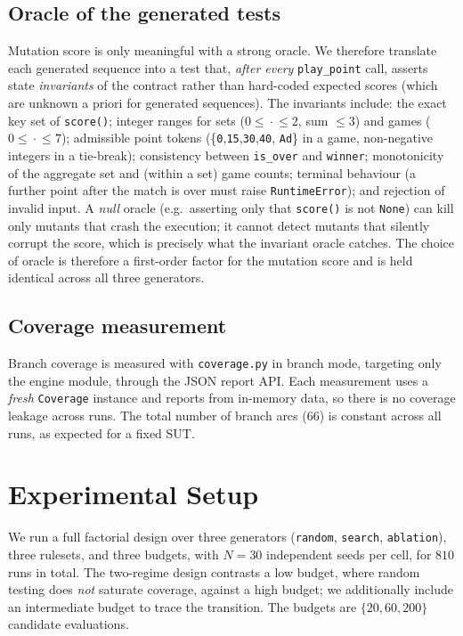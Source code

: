 \documentclass[conference]{IEEEtran}
\begin{document}
\subsection{Oracle of the generated tests}
Mutation score is only meaningful with a strong oracle. We therefore translate
each generated sequence into a test that, \emph{after every} \texttt{play\_point}
call, asserts state \emph{invariants} of the contract rather than hard-coded
expected scores (which are unknown a priori for generated sequences). The
invariants include: the exact key set of \texttt{score()}; integer ranges for
sets ($0\!\le\!\cdot\!\le\!2$, sum $\le 3$) and games ($0\!\le\!\cdot\!\le\!7$);
admissible point tokens (\{\texttt{0},\texttt{15},\texttt{30},\texttt{40},
\texttt{Ad}\} in a game, non-negative integers in a tie-break); consistency
between \texttt{is\_over} and \texttt{winner}; monotonicity of the aggregate set
and (within a set) game counts; terminal behaviour (a further point after the
match is over must raise \texttt{RuntimeError}); and rejection of invalid input.
A \emph{null} oracle (e.g.\ asserting only that \texttt{score()} is not
\texttt{None}) can kill only mutants that crash the execution; it cannot detect
mutants that silently corrupt the score, which is precisely what the invariant
oracle catches. The choice of oracle is therefore a first-order factor for the
mutation score and is held identical across all three generators.

\subsection{Coverage measurement}
Branch coverage is measured with \texttt{coverage.py} in branch mode, targeting
only the engine module, through the JSON report API. Each measurement uses a
\emph{fresh} \texttt{Coverage} instance and reports from in-memory data, so there
is no coverage leakage across runs. The total number of branch arcs (66) is
constant across all runs, as expected for a fixed SUT.

\section{Experimental Setup}
We run a full factorial design over three generators (\texttt{random},
\texttt{search}, \texttt{ablation}), three rulesets, and three budgets, with
$N{=}30$ independent seeds per cell, for $810$ runs in total. The two-regime
design contrasts a low budget, where random testing does \emph{not} saturate
coverage, against a high budget; we additionally include an intermediate budget
to trace the transition. The budgets are $\{20, 60, 200\}$ candidate
evaluations.
\end{document}
